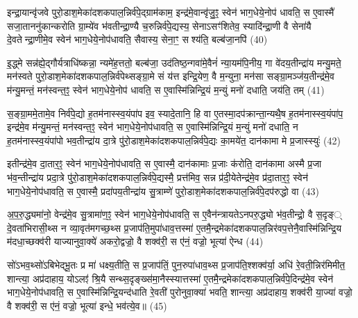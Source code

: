 {\anuvakamend[{इ॒न्द्रि॒याव॑न्त॒ꣵ॒ स्वेन॑ भाग॒धेये॒नोप॑धावति॒ सोऽर्कव॑न्त॒ꣵ॒ स्वेन॑ भाग॒धेये॑नै॒वेन्द्रा॑यास्मा॒न्मृधोऽस्मै स॒प्त च॑।7।}]}

इन्द्रा॒यान्वृ॑जवे पुरो॒डाश॒मेका॑दशकपाल॒न्निर्व॑पे॒द्ग्राम॑काम॒ इन्द्र॑मे॒वान्वृ॑जु॒ꣵ॒ स्वेन॑ भाग॒धेये॒नोप॑ धावति॒ स ए॒वास्मै॑ सजा॒ताननु॑कान्करोति ग्रा॒म्ये॑व भ॑वतीन्द्रा॒ण्यै च॒रुन्निर्व॑पे॒द्यस्य॒ सेनाऽसꣳ॑शितेव॒ स्यादि॑न्द्रा॒णी वै सेना॑यै दे॒वतेन्द्रा॒णीमे॒व स्वेन॑ भाग॒धेये॒नोप॑धावति॒ सैवास्य॒ सेना॒ꣳ॒ सश्य॑ति॒ बल्ब॑जा॒नपि॑ (40)

इ॒द्ध्मे सन्न॑ह्ये॒द्गौर्यत्राधि॑ष्कन्ना॒ न्यमे॑ह॒त्ततो॒ बल्ब॑जा॒ उद॑तिष्ठ॒न्गवा॑मे॒वैनं॑ न्या॒यम॑पि॒नीय॒ गा वे॑दय॒तीन्द्रा॑य मन्यु॒मते॒ मन॑स्वते पुरो॒डाश॒मेका॑दशकपाल॒न्निर्व॑पेथ्सङ्ग्रा॒मे सं य॑त्त इन्द्रि॒येण॒ वै म॒न्युना॒ मन॑सा सङ्ग्रा॒मञ्ज॑य॒तीन्द्र॑मे॒व म॑न्यु॒मन्तं॒ मन॑स्वन्त॒ꣵ॒ स्वेन॑ भाग॒धेये॒नोप॑ धावति॒ स ए॒वास्मि॑न्निन्द्रि॒यं म॒न्युं मनो॑ दधाति॒ जय॑ति॒ तम् (41)

स॒ङ्ग्रा॒ममे॒तामे॒व निर्व॑पे॒द्यो ह॒तम॑नास्स्व॒यंपा॑प इव॒ स्यादे॒तानि॒ हि वा ए॒तस्मा॒दप॑क्रान्ता॒न्यथै॒ष ह॒तम॑नास्स्व॒यंपा॑प॒ इन्द्र॑मे॒व म॑न्यु॒मन्तं॒ मन॑स्वन्त॒ꣵ॒ स्वेन॑ भाग॒धेये॒नोप॑धावति॒ स ए॒वास्मि॑न्निन्द्रि॒यं म॒न्युं मनो॑ दधाति॒ न ह॒तम॑नास्स्व॒यंपा॑पो भव॒तीन्द्रा॑य दा॒त्रे पु॑रो॒डाश॒मेका॑दशकपाल॒न्निर्व॑पे॒द्यः का॒मये॑त॒ दान॑कामा मे प्र॒जास्स्युः॑ (42)

इतीन्द्र॑मे॒व दा॒तार॒ꣵ॒ स्वेन॑ भाग॒धेये॒नोप॑धावति॒ स ए॒वास्मै॒ दान॑कामाः प्र॒जाः क॑रोति॒ दान॑कामा अस्मै प्र॒जा भ॑व॒न्तीन्द्रा॑य प्रदा॒त्रे पु॑रो॒डाश॒मेका॑दशकपाल॒न्निर्व॑पे॒द्यस्मै॒ प्रत्त॑मिव॒ सन्न प्र॑दी॒येतेन्द्र॑मे॒व प्र॑दा॒तार॒ꣵ॒ स्वेन॑ भाग॒धेये॒नोप॑धावति॒ स ए॒वास्मै॒ प्रदा॑पय॒तीन्द्रा॑य सु॒त्राम्णे॑ पुरो॒डाश॒मेका॑दशकपाल॒न्निर्व॑पे॒दप॑रुद्धो वा (43)

अ॒प॒रु॒द्ध्यमा॑नो॒ वेन्द्र॑मे॒व सु॒त्रामा॑ण॒ꣵ॒ स्वेन॑ भाग॒धेये॒नोप॑धावति॒ स ए॒वैन॑न्त्रायतेऽनपरु॒द्ध्यो भ॑व॒तीन्द्रो॒ वै स॒दृङ्् दे॒वता॑भिरासी॒थ्स न व्या॒वृत॑मगच्छ॒थ्स प्र॒जाप॑ति॒मुपा॑धाव॒त्तस्मा॑ ए॒तमै॒न्द्रमेका॑दशकपाल॒न्निर॑वप॒त्तेनै॒वास्मि॑न्निन्द्रि॒य म॑दधा॒च्छक्व॑री याज्यानुवा॒क्ये॑ अकरो॒द्वज्रो॒ वै शक्व॑री॒ स ए॑नं॒ वज्रो॒ भूत्या॑ ऐन्ध (44)

सो॑ऽभव॒थ्सो॑ऽबिभेद्भू॒तः प्र मा॑ धक्ष्य॒तीति॒ स प्र॒जाप॑तिं॒ पुन॒रुपा॑धाव॒थ्स प्र॒जाप॑ति॒श्शक्व॑र्या॒ अधि॑ रे॒वती॒न्निर॑मिमीत॒ शान्त्या॒ अप्र॑दाहाय॒ योऽलꣵ॑ श्रि॒यै सन्थ्स॒दृङ्ख्स॑मा॒नैस्स्यात्तस्मा॑ ए॒तमै॒न्द्रमेका॑दशकपाल॒न्निर्व॑पे॒दिन्द्र॑मे॒व स्वेन॑ भाग॒धेये॒नोप॑धावति॒ स ए॒वास्मि॑न्निन्द्रि॒यन्द॑धाति रे॒वती॑ पुरोनुवा॒क्या॑ भवति॒ शान्त्या॒ अप्र॑दाहाय॒ शक्व॑री या॒ज्या॑ वज्रो॒ वै शक्व॑री॒ स ए॑नं॒ वज्रो॒ भूत्या॑ इन्धे॒ भव॑त्ये॒व॥ (45)

